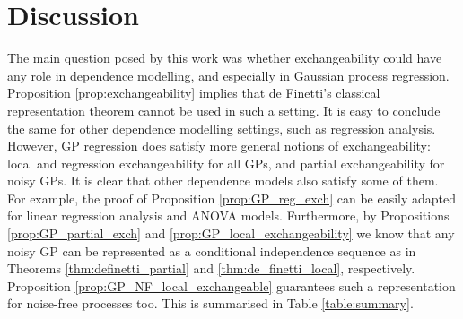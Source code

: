 

\section{Discussion} \label{section:discussion}


The main question posed by this work was whether exchangeability could have any role in dependence modelling, and especially in Gaussian process regression. Proposition \ref{prop:exchangeability} implies that de Finetti's classical representation theorem cannot be used in such a setting. It is easy to conclude the same for other dependence modelling settings, such as regression analysis. 
\\


However, GP regression does satisfy more general notions of exchangeability: local and regression exchangeability for all GPs, and partial exchangeability for noisy GPs. It is clear that other dependence models also satisfy some of them. For example, the proof of Proposition \ref{prop:GP_reg_exch} can be easily adapted for linear regression analysis and ANOVA models. Furthermore, by Propositions \ref{prop:GP_partial_exch} and \ref{prop:GP_local_exchangeability} we know that any noisy GP can be represented as a conditional independence sequence as in Theorems \ref{thm:definetti_partial} and \ref{thm:de_finetti_local}, respectively. Proposition \ref{prop:GP_NF_local_exchangeable} guarantees such a representation for noise-free processes too. This is summarised in Table \ref{table:summary}.
\\







